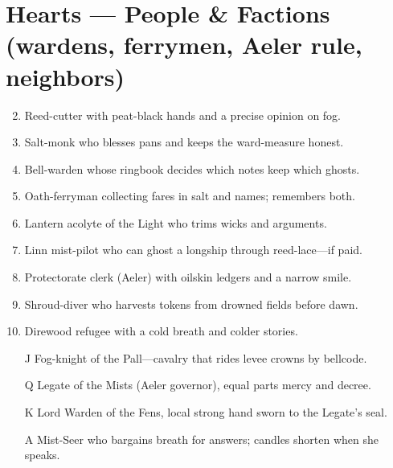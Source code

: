 \section*{Hearts --- People \& Factions (wardens, ferrymen, Aeler rule, neighbors)}
\begin{enumerate}
\setcounter{enumi}{1}
\item Reed-cutter with peat-black hands and a precise opinion on fog.
\item Salt-monk who blesses pans and keeps the ward-measure honest.
\item Bell-warden whose ringbook decides which notes keep which ghosts.
\item Oath-ferryman collecting fares in salt and names; remembers both.
\item Lantern acolyte of the Light who trims wicks and arguments.
\item Linn mist-pilot who can ghost a longship through reed-lace---if paid.
\item Protectorate clerk (Aeler) with oilskin ledgers and a narrow smile.
\item Shroud-diver who harvests tokens from drowned fields before dawn.
\item Direwood refugee with a cold breath and colder stories.
\item[J] Fog-knight of the Pall---cavalry that rides levee crowns by bellcode.
\item[Q] Legate of the Mists (Aeler governor), equal parts mercy and decree.
\item[K] Lord Warden of the Fens, local strong hand sworn to the Legate's seal.
\item[A] Mist-Seer who bargains breath for answers; candles shorten when she speaks.
\end{enumerate}

